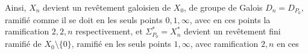 Ainsi, $X_n$ devient un revêtement galoisien de $X_0$, de groupe de Galois $D_n=D_{P_0}$, ramifié comme il se doit en les seuls points $0,1,\infty$, avec en ces points la ramification $2,2,n$ respectivement, et $\Sigma_{P_0}^*=X_n^*$ devient un revêtement fini ramifié  de $X_0\setminus\{0\}$, ramifié en les seuls points $1,\infty$, avec ramification $2,n$ en ces

